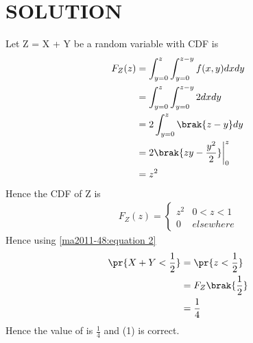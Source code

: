 \section{SOLUTION}
Let Z = X + Y be a random variable with CDF is 
\begin{align}
    F_{Z}(z) &= \int_{y=0}^{z}\int_{y=0}^{z-y}f(x,y)dxdy\\
    &= \int_{y=0}^{z}\int_{y=0}^{z-y}2dxdy \\
    &= 2\int_{y=0}^{z}\brak{z-y}dy\\
    &= 2\brak{zy-\frac{y^2}{2}}\bigg|_{0}^{z}\\
    &= z^{2}
\end{align}
Hence the CDF of Z is 
\begin{align}\label{ma2011-48:equation 2}
    F_{Z}(z) = 
    \begin{cases}
        z^{2} & 0<z<1\\
        0 & elsewhere
    \end{cases}
\end{align}
Hence using \eqref{ma2011-48:equation 2}
\begin{align}
    \pr{X+Y<\displaystyle\frac{1}{2}} &= \pr{z<\displaystyle\frac{1}{2}}\\
    &=F_{Z}\brak{\frac{1}{2}}\\
    &= \frac{1}{4}
\end{align}
Hence the value of  is $\displaystyle\frac{1}{4}$ and (1) is correct.